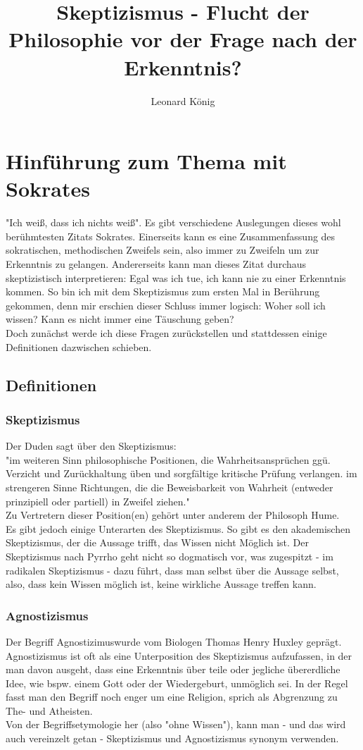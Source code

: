 \documentclass[12pt,a4paper]{article}
\author{Leonard König}
\title{Skeptizismus - Flucht der Philosophie vor der Frage nach der Erkenntnis?}
\begin{document}
\maketitle
\tableofcontents
\newpage
\section{Hinführung zum Thema mit Sokrates}
"Ich weiß, dass ich nichts weiß". Es gibt verschiedene Auslegungen dieses wohl berühmtesten Zitats Sokrates.%
 Einerseits kann es eine Zusammenfassung des sokratischen, methodischen Zweifels sein, also immer zu Zweifeln um zur Erkenntnis zu gelangen. Andererseits kann man dieses Zitat durchaus skeptizistisch interpretieren: Egal was ich tue, ich kann nie zu einer Erkenntnis kommen. So bin ich mit dem Skeptizismus zum ersten Mal in Berührung gekommen, denn mir erschien dieser Schluss immer logisch: Woher soll ich wissen? Kann es nicht immer eine Täuschung geben?\\
Doch zunächst werde ich diese Fragen zurückstellen und stattdessen einige Definitionen dazwischen schieben.
	\subsection{Definitionen}
		\subsubsection{Skeptizismus}
Der Duden sagt über den Skeptizismus:\\
"im weiteren Sinn philosophische Positionen, die Wahrheitsansprüchen ggü. Verzicht und Zurückhaltung üben und sorgfältige kritische Prüfung verlangen.
im strengeren Sinne Richtungen, die die Beweisbarkeit von Wahrheit (entweder prinzipiell oder partiell) in Zweifel ziehen."%
\\Zu Vertretern dieser Position(en) gehört unter anderem 
der Philosoph Hume.\\%
Es gibt jedoch einige Unterarten des Skeptizismus. So gibt es den akademischen Skeptizismus, der die Aussage trifft, das Wissen nicht Möglich ist. Der Skeptizismus nach Pyrrho geht nicht so dogmatisch vor, was zugespitzt - im radikalen Skeptizismus - dazu führt, dass man selbst über die Aussage selbst, also, dass kein Wissen möglich ist, keine wirkliche Aussage treffen kann.%
		\subsubsection{Agnostizismus}
Der Begriff \glqq Agnostizimus\grqq wurde vom Biologen Thomas Henry Huxley geprägt. Agnostizismus ist oft als eine Unterposition des Skeptizismus aufzufassen, in der man davon ausgeht, dass eine Erkenntnis über teile oder jegliche übererdliche%
 Idee, wie bspw. einem Gott oder der Wiedergeburt, unmöglich sei. In der Regel fasst man den Begriff noch enger um eine Religion, sprich als Abgrenzung zu The- und Atheisten.\\ 
Von der Begriffsetymologie her (also "ohne Wissen"), kann man - und das wird auch vereinzelt getan - Skeptizismus und Agnostizismus synonym verwenden.
\end{document}
